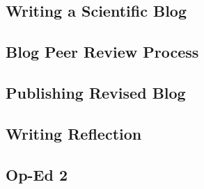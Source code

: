 \documentclass{article}\usepackage[]{graphicx}\usepackage[]{color}
\begin{document}

%

\subsection{Writing a Scientific Blog}




\subsection{Blog Peer Review Process}




\subsection{Publishing Revised Blog}




\subsection{Writing Reflection}



\subsection{Op-Ed 2}





%
\end{document}
